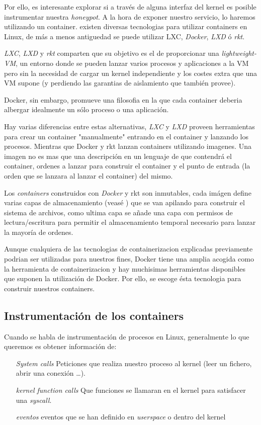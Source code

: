 Por ello, es interesante explorar si a través de alguna interfaz del kernel es posible instrumentar nuestra \emph{honeypot}. A la hora de exponer nuestro servicio, lo haremos utilizando
un container. existen diversas tecnologias para utilizar containers en Linux, de más a menos antiguedad se puede utilizar LXC, \emph{Docker}, \emph{LXD} ó \emph{rkt}.

\emph{LXC}, \emph{LXD} y \emph{rkt} comparten que su objetivo es el de proporcionar una \emph{lightweight-VM}, un entorno donde se pueden lanzar varios procesos y aplicaciones a la VM
pero sin la necesidad de cargar un kernel independiente y los costes extra que una VM supone (y perdiendo las garantias de aislamiento que también provee).

Docker, sin embargo, promueve una filosofia en la que cada container deberia albergar idealmente un sólo proceso o una aplicación.

Hay varias diferencias entre estas alternativas, \emph{LXC} y \emph{LXD} proveen herramientas para crear un container "manualmente" entrando en el container y lanzando los procesos. Mientras que Docker y rkt
lanzan containers utilizando imagenes. Una imagen no es mas que una descripción en un lenguaje de que contendrá el container, ordenes a lanzar para construir el container y el punto de entrada (la orden que se lanzara al lanzar el container) del mismo.

Los \emph{containers} construidos con \emph{Docker} y rkt son inmutables, cada imágen define varias capas de almacenamiento (veasé \cite{docker-storage}) que se van apilando
para construir el sistema de archivos, como ultima capa se añade una capa con permisos de lectura/escritura para permitir el almacenamiento temporal necesario para lanzar
la mayoría de ordenes.

Aunque cualquiera de las tecnologias de containerizacion explicadas previamente podrian ser utilizadas para nuestros fines, Docker tiene una amplia acogida como la herramienta de containerizacion
y hay muchisimas herramientas disponibles que suponen la utilización de Docker. Por ello, se escoge ésta tecnologia para construir nuestros containers.

\subsection{Instrumentación de los containers}

Cuando se habla de instrumentación de procesos en Linux, generalmente lo que queremos es obtener información de:
\begin{enumerate}
    \item[\emph{System calls}] Peticiones que realiza nuestro proceso al kernel (leer un fichero, abrir una conexión \ldots).
    \item[\emph{kernel function calls}] Que funciones se llamaran en el kernel para satisfacer una \emph{syscall}.
    \item[\emph{eventos}] eventos que se han definido en \emph{userspace} o dentro del kernel
\end{enumerate}

